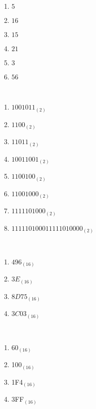 \begin{Soln}{1}
		~\\ \vspace{-7mm}
		\begin{multicols}{2}
			\begin{enumerate}
				\item $5$
				\item $16$
				\item $15$
				\item $21$
				\item $3$
				\item $56$

			\end{enumerate}
		\end{multicols}
	
\end{Soln}
\begin{Soln}{2}
	~\\ \vspace{-7mm}
	\begin{multicols}{2}
		\begin{enumerate}
			\item $1001011_{(2)}$
			\item $1100_{(2)}$
			\item $11011_{(2)}$
			\item $10011001_{(2)}$
			\item $1100100_{(2)}$
			\item $11001000_{(2)}$
			\item $1111101000_{(2)}$
			\item $111110100011111010000_{(2)}$
		\end{enumerate}
	\end{multicols}
\end{Soln}
\begin{Soln}{3}
	~\\ \vspace{-7mm}
	\begin{multicols}{2}
		\begin{enumerate}
			\item $496_{(16)}$
			\item $3E_{(16)}$
			\item  $8D75_{(16)}$
			\item $3C03_{(16)}$
		\end{enumerate}
	\end{multicols}
\end{Soln}
\begin{Soln}{4}
	~\\ \vspace{-7mm}
	\begin{multicols}{2}
		\begin{enumerate}
			\item 60$_{(16)}$
			\item 100$_{(16)}$
			\item  1F4$_{(16)}$
			\item 3FF$_{(16)}$
		\end{enumerate}
	\end{multicols}
\end{Soln}

